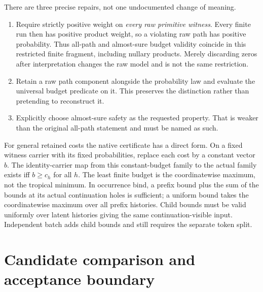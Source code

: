 \documentclass[11pt,a4paper]{article}
\theoremstyle{definition}
\begin{document}
There are three precise repairs, not one undocumented change of meaning.
\begin{enumerate}[label=\textup{(\roman*)}]
\item Require strictly positive weight on \emph{every raw primitive witness}.
Every finite run then has positive product weight, so a violating raw path
has positive probability. Thus all-path and almost-sure budget validity
coincide in this restricted finite fragment, including nullary products.
Merely discarding zeros after interpretation changes the raw model and is
not the same restriction.
\item Retain a raw path component alongside the probability law and evaluate
the universal budget predicate on it. This preserves the distinction rather
than pretending to reconstruct it.
\item Explicitly choose almost-sure safety as the requested property. That
is weaker than the original all-path statement and must be named as such.
\end{enumerate}

For general retained costs the native certificate has a direct form.
On a fixed witness carrier with its fixed probabilities, replace each cost
by a constant vector $b$. The identity-carrier map from this constant-budget
family to the actual family exists iff $b\ge c_h$ for all $h$.
The least finite budget is the coordinatewise maximum, not the tropical
minimum. In occurrence bind, a prefix bound plus the sum of the bounds at
its actual continuation holes is sufficient; a uniform bound takes the
coordinatewise maximum over all prefix histories. Child bounds must be
valid uniformly over latent histories giving the same continuation-visible
input. Independent batch adds child bounds and still requires the separate
token split.

\section{Candidate comparison and acceptance boundary}\label{sec:acceptance}
\end{document}
